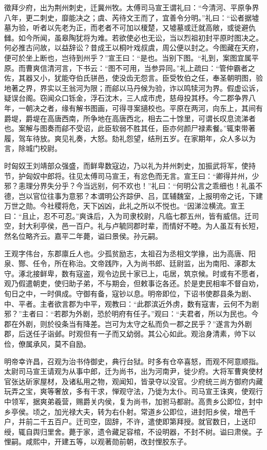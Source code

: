 \documentclass[12pt,UTF8]{ctexbook}
\begin{document}
徵拜少府，出为荆州刺史，迁冀州牧。太傅司马宣王谓礼曰：“今清河、平原争界八年，更二刺史，靡能决之；虞、芮待文王而了，宜善令分明。”礼曰：“讼者据墟墓为验，听者以先老为正，而老者不可加以榎楚，又墟墓或迁就高敞，或徙避仇雠。如今所闻，虽皋陶犹将为难。若欲使必也无讼，当以烈祖初封平原时图决之。何必推古问故，以益辞讼？昔成王以桐叶戏叔虞，周公便以封之。今图藏在天府，便可於坐上断也，岂待到州乎？”宣王曰：“是也。当别下图。“礼到，案图宜属平原。而曹爽信清河言，下书云：“图不可用，当参异同。”礼上疏曰：“管仲霸者之佐，其器又小，犹能夺伯氏骈邑，使没齿无怨言。臣受牧伯之任，奉圣朝明图，验地著之界，界实以王翁河为限；而鄃以马丹候为验，诈以鸣犊河为界。假虚讼诉，疑误台阁。窃闻众口铄金，浮石沈木，三人成巿虎，慈母投其杼。今二郡争界八年，一朝决之者，缘有解书图画，可得寻案擿校也。平原在两河，向东上，其间有爵堤，爵堤在高唐西南，所争地在高唐西北，相去二十馀里，可谓长叹息流涕者也。案解与图奏而鄃不受诏，此臣软弱不胜其任，臣亦何颜尸禄素餐。”辄束带著履，驾车待放。爽见礼奏，大怒。劾礼怨望，结刑五岁。在家期年，众人多以为言，除城门校尉。

时匈奴王刘靖部众强盛，而鲜卑数寇边，乃以礼为并州刺史，加振武将军，使持节，护匈奴中郎将。往见太傅司马宣王，有忿色而无言。宣王曰：“卿得并州，少邪？恚理分界失分乎？今当远别，何不欢也！”礼曰：“何明公言之乖细也！礼虽不德，岂以官位往事为意邪？本谓明公齐踪伊、吕，匡辅魏室，上报明帝之讬，下建万世之勋。今社稷将危，天下凶凶，此礼之所以不悦也。“因涕泣横流。宣王曰：“且止，忍不可忍。”爽诛后，入为司隶校尉，凡临七郡五州，皆有威信。迁司空，封大利亭侯，邑一百户。礼与卢毓同郡时辈，而情好不睦。为人虽互有长短，然名位略齐云。嘉平二年薨，谥曰景侯。孙元嗣。

王观字伟台，东郡廪丘人也。少孤贫励志，太祖召为丞相文学掾，出为高唐、阳泉、酂、任令，所在称治。文帝践阼，入为尚书郎、廷尉监，出为南阳、涿郡太守。涿北接鲜卑，数有寇盗，观令边民十家已上，屯居，筑京候。时或有不愿者，观乃假遣朝吏，使归助子弟，不与期会，但敕事讫各还。於是吏民相率不督自劝，旬日之中，一时俱成。守御有备，寇钞以息。明帝即位，下诏书使郡县条为剧、中、平者。主者欲言郡为中平，观教曰：“此郡滨近外虏，数有寇害，云何不为剧邪？”主者曰：“若郡为外剧，恐於明府有任子。”观曰：“夫君者，所以为民也。今郡在外剧，则於役条当有降差。岂可为太守之私而负一郡之民乎？”遂言为外剧郡，后送任子诣邺。时观但有一子而又幼弱。其公心如此。观治身清素，帅下以俭，僚属承风，莫不自励。

明帝幸许昌，召观为治书侍御史，典行台狱。时多有仓卒喜怒，而观不阿意顺指。太尉司马宣王请观为从事中郎，迁为尚书，出为河南尹，徙少府。大将军曹爽使材官张达斫家屋材，及诸私用之物，观闻知，皆录夺以没官。少府统三尚方御府内藏玩弄之宝，爽等奢放，多有干求，惮观守法，乃徙为太仆。司马宣王诛爽，使观行中领军，据爽弟羲营，赐爵关内侯，复为尚书，加驸马都尉。高贵乡公即位，封中乡亭侯。顷之，加光禄大夫，转为右仆射。常道乡公即位，进封阳乡侯，增邑千户，并前二千五百户。迁司空，固辞，不许，遣使即第拜授。就官数日，上送印绶，辄自舆归里舍。薨于家，遗令藏足容棺，不设明器，不封不树。谥曰肃侯。子悝嗣。咸熙中，开建五等，以观著勋前朝，改封悝胶东子。
\end{document}
